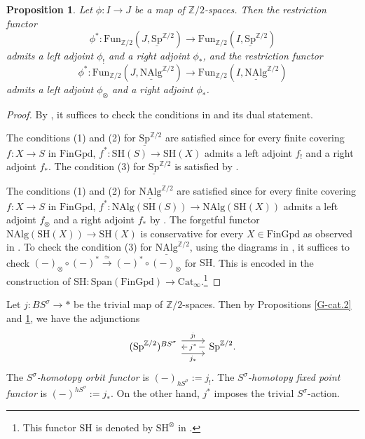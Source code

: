 \documentclass[10pt]{amsart}
\newtheorem{prop}[thm]{Proposition}
\theoremstyle{definition}
\numberwithin{equation}{section}
\newcommand{\Z}{\mathbb{Z}}
\newcommand{\ul}{\underline}
\newcommand{\Fun}{\mathrm{Fun}}
\newcommand{\NAlg}{\mathrm{NAlg}}
\newcommand{\Sp}{\mathrm{Sp}}
\newcommand{\Span}{\mathrm{Span}}
\newcommand{\Cat}{\mathrm{Cat}}
\newcommand{\FinGpd}{\mathrm{FinGpd}}
\newcommand{\SH}{\mathrm{SH}}
\begin{document}
\begin{prop}
\label{G-cat.1}
Let $\phi\colon I\to J$ be a map of $\Z/2$-spaces.
Then the restriction functor
\[
\phi^*\colon \Fun_{\Z/2}(J,\ul{\Sp}^{\Z/2})
\to
\Fun_{\Z/2}(I,\ul{\Sp}^{\Z/2})
\]
admits a left adjoint $\phi_!$ and a right adjoint $\phi_*$,
and the restriction functor
\[
\phi^*\colon \Fun_{\Z/2}(J,\ul{\NAlg}^{\Z/2})
\to
\Fun_{\Z/2}(I,\ul{\NAlg}^{\Z/2})
\]
admits a left adjoint $\phi_\otimes$ and a right adjoint $\phi_*$.
\end{prop}
\begin{proof}
By \cite[Observation 4.2]{QS21},
it suffices to check the conditions in \cite[Theorem B]{2109.11954} and its dual statement.

The conditions (1) and (2) for $\ul{\Sp}^{\Z/2}$ are satisfied since for every finite covering $f\colon X\to S$ in $\FinGpd$,
$f^*\colon \SH(S)\to \SH(X)$ admits a left adjoint $f_!$ and a right adjoint $f_*$.
The condition (3) for $\ul{\Sp}^{\Z/2}$ is satisfied by \cite[Proposition A.1.9]{HP23}.

The conditions (1) and (2) for $\ul{\NAlg}^{\Z/2}$ are satisfied since for every finite covering $f\colon X\to S$ in $\FinGpd$, $f^*\colon \NAlg(\SH(S))\to \NAlg(\SH(X))$ admits a left adjoint $f_\otimes$ and a right adjoint $f_*$ by \cite[Propositions A.1.11, A.1.12]{HP23}.
The forgetful functor $\NAlg(\SH(X))\to \SH(X)$ is conservative for every $X\in \FinGpd$ as observed in \cite[\S A.1.1]{HP23}.
To check the condition (3)  for $\ul{\NAlg}^{\Z/2}$,
using the diagrams in  \cite[Propositions A.1.11, A.1.12]{HP23},
it suffices to check $(-)_\otimes \circ (-)^* \xrightarrow{\simeq} (-)^* \circ (-)_\otimes$ for $\SH$.
This is encoded in the construction of $\SH\colon \Span(\FinGpd)\to  \Cat_\infty$.\footnote{This functor $\SH$ is denoted by $\SH^\otimes$ in \cite{HP23}.}
\end{proof}

Let $j\colon B S^\sigma\to *$ be the trivial map of $\Z/2$-spaces.
Then by Propositions \ref{G-cat.2} and \ref{G-cat.1}, we have the adjunctions
\[
\begin{tikzcd}
(\Sp^{\Z/2})^{B S^\sigma}
\ar[r,shift left=1.5ex,"j_!"]
\ar[r,"j^*" description,leftarrow]
\ar[r,"j_*"',shift right=1.5ex]
&
\Sp^{\Z/2}.
\end{tikzcd}
\]
The \emph{$S^\sigma$-homotopy orbit functor} is $(-)_{hS^\sigma}:=j_!$.
The \emph{$S^\sigma$-homotopy fixed point functor} is $(-)^{hS^\sigma}:=j_*$.
On the other hand,
$j^*$ imposes the trivial $S^\sigma$-action.
\end{document}
